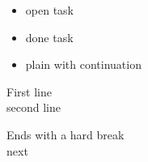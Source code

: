 \begin{itemize}
  \item[{[ ]}] open task
  \item[{[x]}] done task
  \item plain with
    continuation
\end{itemize}

First line\\
second line

Ends with a hard break\\
next
